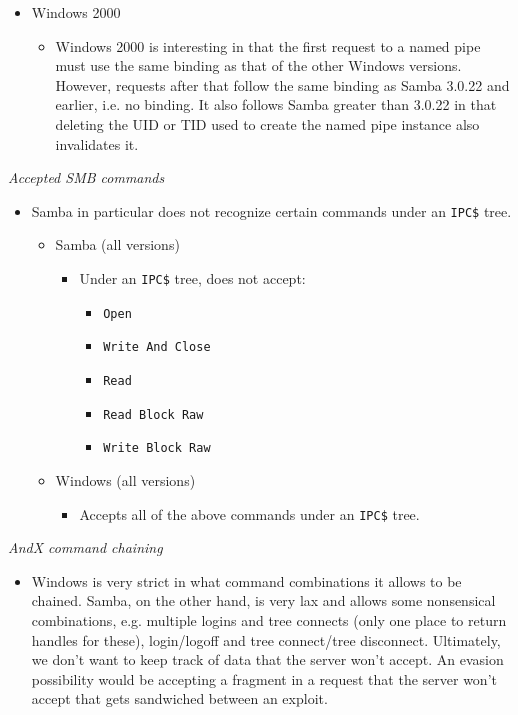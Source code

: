 \documentclass[english]{report}
\begin{document}
\begin{itemize}
\begin{itemize}
\begin{itemize}
\end{itemize}

\item[] Windows 2000

\begin{itemize}

\item[] Windows 2000 is interesting in that the first request to a named pipe
must use the same binding as that of the other Windows versions. However,
requests after that follow the same binding as Samba 3.0.22 and earlier, i.e.
no binding. It also follows Samba greater than 3.0.22 in that deleting the UID
or TID used to create the named pipe instance also invalidates it.

\end{itemize}
\end{itemize}
\end{itemize}

\textit{Accepted SMB commands}
\begin{itemize}

\item[] Samba in particular does not recognize certain commands under an
\texttt{IPC\$} tree.
\begin{itemize}
\item[] Samba (all versions)
\begin{itemize}
\item[] Under an \texttt{IPC\$} tree, does not accept:
\begin{itemize}
\item[] \texttt{Open}
\item[] \texttt{Write And Close}
\item[] \texttt{Read}
\item[] \texttt{Read Block Raw}
\item[] \texttt{Write Block Raw}
\end{itemize}
\end{itemize}

\item[] Windows (all versions)
\begin{itemize}

\item[] Accepts all of the above commands under an \texttt{IPC\$} tree.
\end{itemize}
\end{itemize}
\end{itemize}

\textit{AndX command chaining}
\begin{itemize}

\item[] Windows is very strict in what command combinations it allows to be
chained. Samba, on the other hand, is very lax and allows some nonsensical
combinations, e.g. multiple logins and tree connects (only one place to return
handles for these), login/logoff and tree connect/tree disconnect.  Ultimately,
we don't want to keep track of data that the server won't accept. An evasion
possibility would be accepting a fragment in a request that the server won't
accept that gets sandwiched between an exploit.

\end{itemize}
\end{document}
